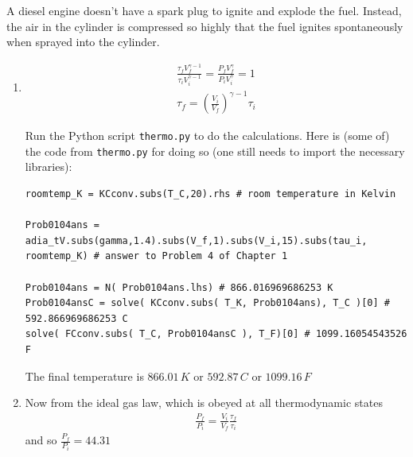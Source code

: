 A diesel engine doesn't have a spark plug to ignite and explode the fuel.  Instead, the air in the cylinder is compressed so highly that the fuel ignites spontaneously when sprayed into the cylinder.  

\begin{enumerate}
\item[(a)] 
\[
\begin{gathered}
  \frac{ \tau_f V_f^{\gamma -1} }{ \tau_i V_i^{\gamma -1} } = \frac{ P_f V_f^{\gamma }}{ P_i V_i^{\gamma} } = 1 \\
  \tau_f = \left( \frac{V_i}{V_f} \right)^{\gamma -1 }\tau_i
\end{gathered}
\]

Run the Python script \verb|thermo.py| to do the calculations.  Here is (some of) the code from \verb|thermo.py| for doing so (one still needs to import the necessary libraries):

\begin{lstlisting}
roomtemp_K = KCconv.subs(T_C,20).rhs # room temperature in Kelvin                               

Prob0104ans = adia_tV.subs(gamma,1.4).subs(V_f,1).subs(V_i,15).subs(tau_i, roomtemp_K) # answer to Problem 4 of Chapter 1                                                                           

Prob0104ans = N( Prob0104ans.lhs) # 866.016969686253 K                                         
Prob0104ansC = solve( KCconv.subs( T_K, Prob0104ans), T_C )[0] # 592.866969686253 C            
solve( FCconv.subs( T_C, Prob0104ansC ), T_F)[0] # 1099.16054543526 F   
\end{lstlisting}

The final temperature is $866.01 \, K$ or $592.87 \, C$ or $1099.16 \, F$

\item[(b)] Now from the ideal gas law, which is obeyed at all thermodynamic states
\[
\begin{gathered}
  \frac{P_f}{ P_i} = \frac{V_i}{V_f} \frac{ \tau_f}{ \tau_i}
\end{gathered}
\]
and so $\frac{P_f}{P_i} = 44.31$
\end{enumerate}

